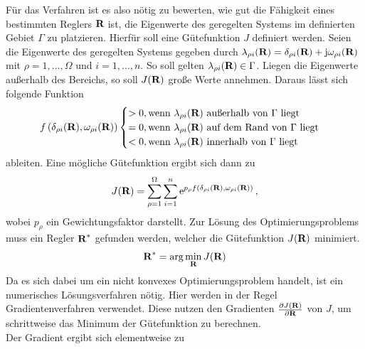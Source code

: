 Für das Verfahren ist es also nötig zu bewerten, wie gut die Fähigkeit eines bestimmten Reglers $\textbf{R}$ ist, die Eigenwerte des geregelten Systems im definierten Gebiet $\Gamma$ zu platzieren.
Hierfür soll eine Gütefunktion $J$ definiert werden. 
Seien die Eigenwerte des geregelten Systems gegeben durch 
$\lambda_{\rho i}(\textbf{R}) = \delta_{\rho i} (\textbf{R}) + \textnormal{j} \omega_{\rho i}(\textbf{R}) $ 
mit $\rho = 1,...,\Omega$ und $i = 1, ..., n$.
So soll gelten $\lambda_{\rho i}(\textbf{R}) \in \Gamma$. Liegen die Eigenwerte außerhalb des Bereichs, so soll $J(\textbf{R})$ große Werte annehmen.
Daraus lässt sich folgende Funktion \\
\begin{equation}
	f\left(\delta_{\rho i}(\textbf{R}) ,\omega_{\rho i}(\textbf{R})\right) 
	\begin{cases}
		> 0 , \textnormal{wenn } \lambda_{\rho i}(\textbf{R}) \textnormal{ außerhalb von } \Gamma \textnormal{ liegt} \\
		= 0 , \textnormal{wenn } \lambda_{\rho i}(\textbf{R}) \textnormal{ auf dem Rand von } \Gamma \textnormal{ liegt} \\
		< 0 , \textnormal{wenn } \lambda_{\rho i}(\textbf{R}) \textnormal{ innerhalb von } \Gamma \textnormal{ liegt} \\
	\end{cases}
\end{equation}
ableiten.
Eine mögliche Gütefunktion ergibt sich dann zu 
\begin{equation}\label{eq:GueteMExp}
	J(\textbf{R}) = \sum_{\rho = 1}^{\Omega} \sum_{i=1}^{n} \mathrm{e}^{p_\rho f\left(\delta_{\rho i}(\textbf{R}) ,\omega_{\rho i}(\textbf{R})\right)}\,,
\end{equation}
wobei $p_\rho$ ein Gewichtungsfaktor darstellt.
Zur Lösung des Optimierungsproblems muss ein Regler $\textbf{R}^*$ gefunden werden, welcher die Gütefunktion $J(\textbf{R})$ minimiert.
\begin{equation}
	\textbf{R}^* = \textnormal{arg} \min_{\textbf{R}} J(\textbf{R})
\end{equation}
Da es sich dabei um ein nicht konvexes Optimierungsproblem handelt, ist ein numerisches Lösungsverfahren nötig.
Hier werden in der Regel Gradientenverfahren verwendet. Diese nutzen den Gradienten $\frac{\partial J(\textbf{R})}{\partial \textbf{R}}$ von $J$, um schrittweise das Minimum der Gütefunktion zu berechnen.\\
Der Gradient ergibt sich elementweise zu
